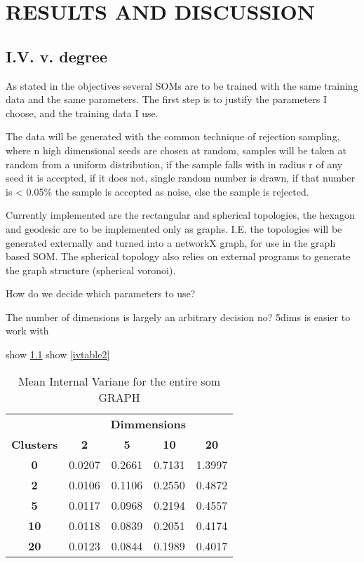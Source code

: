 \chapter{RESULTS AND DISCUSSION}




\section{I.V. v. degree}

As stated in the objectives several SOMs are to be trained with the same
training data and the same parameters.  The first step is to justify the
parameters I choose, and the training data I use.

The data will be generated with the common technique of rejection sampling,
where n high dimensional seeds are chosen at random, samples will be taken
at random from a uniform distribution, if the sample falls with in radius r of
any seed it is accepted, if it does not, single random number is drawn, if that
number is < 0.05\% the sample is accepted as noise, else the sample is rejected.

Currently implemented are the rectangular and spherical topologies, the hexagon
and geodesic are to be implemented only as graphs.  I.E. the topologies will be
generated externally and turned into a networkX graph, for use in the graph
based SOM. The spherical topology also relies on external programs to generate
the graph structure (spherical voronoi).

How do we decide which parameters to use?

The number of dimensions is largely an arbitrary decision no?
5dims is easier to work with

show \ref{ivtable1}
show \ref{ivtable2}

\begin{table}
\caption{Mean Internal Variane for the entire som GRAPH}
\label{ivtable1}
\begin{tabular}{|c||c|c|c|c|}
\hline
&\multicolumn{4}{c|}{\textbf{Dimmensions}}\\
\textbf{Clusters} & \multicolumn{1}{c}{\textbf{2}} &
\multicolumn{1}{c}{\textbf{5}} & \multicolumn{1}{c}{\textbf{10}} &
\multicolumn{1}{c|}{\textbf{20}}\\
\hline
\hline
\textbf{0} & 0.0207& 0.2661& 0.7131& 1.3997 \\
\hline
\textbf{2} & 0.0106& 0.1106& 0.2550& 0.4872 \\
\hline
\textbf{5} & 0.0117& 0.0968& 0.2194& 0.4557 \\
\hline
\textbf{10} & 0.0118& 0.0839& 0.2051& 0.4174 \\
\hline
\textbf{20} & 0.0123& 0.0844& 0.1989& 0.4017 \\
\hline
\end{tabular} \end{table}



